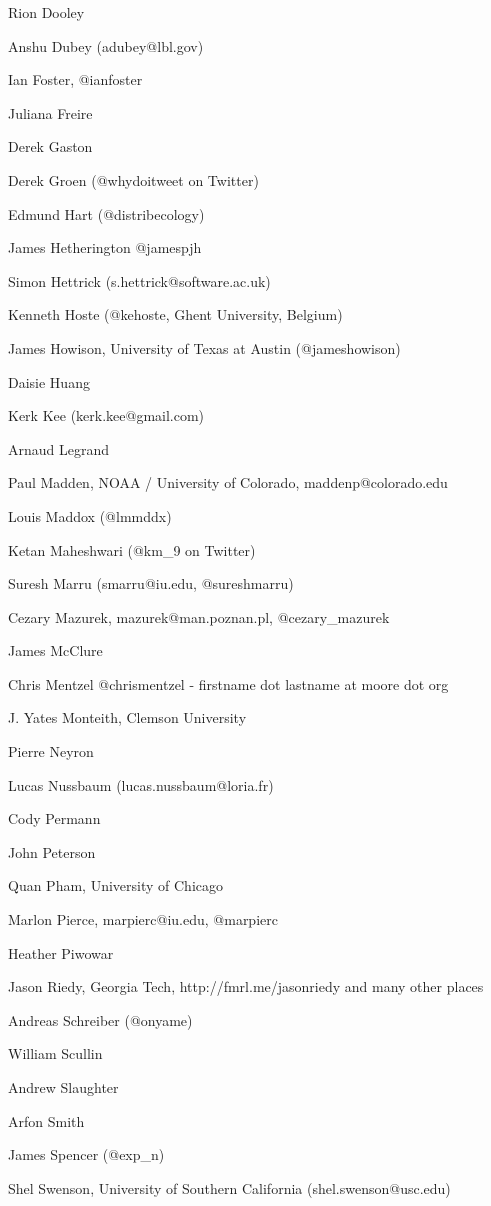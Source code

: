 \documentclass[11pt, oneside]{amsart}
\begin{document}
Rion Dooley

Anshu Dubey (adubey@lbl.gov)

Ian Foster, @ianfoster

Juliana Freire

Derek Gaston

Derek Groen (@whydoitweet on Twitter)

Edmund Hart (@distribecology)

James Hetherington @jamespjh

Simon Hettrick (s.hettrick@software.ac.uk)

Kenneth Hoste (@kehoste, Ghent University, Belgium)

James Howison, University of Texas at Austin (@jameshowison)

Daisie Huang

Kerk Kee (kerk.kee@gmail.com)

Arnaud Legrand

Paul Madden, NOAA / University of Colorado, maddenp@colorado.edu

Louis Maddox (@lmmddx)

Ketan Maheshwari (@km\_9 on Twitter)

Suresh Marru (smarru@iu.edu, @sureshmarru) 

Cezary Mazurek, mazurek@man.poznan.pl, @cezary\_mazurek

James McClure

Chris Mentzel @chrismentzel - firstname dot lastname at moore dot org

J. Yates Monteith, Clemson University

Pierre Neyron

Lucas Nussbaum (lucas.nussbaum@loria.fr)

Cody Permann

John Peterson

Quan Pham, University of Chicago

Marlon Pierce, marpierc@iu.edu, @marpierc

Heather Piwowar

Jason Riedy, Georgia Tech, http://fmrl.me/jasonriedy and many other places

Andreas Schreiber (@onyame)

William Scullin

Andrew Slaughter

Arfon Smith

James Spencer (@exp\_n)

Shel Swenson, University of Southern California (shel.swenson@usc.edu)
\end{document}
